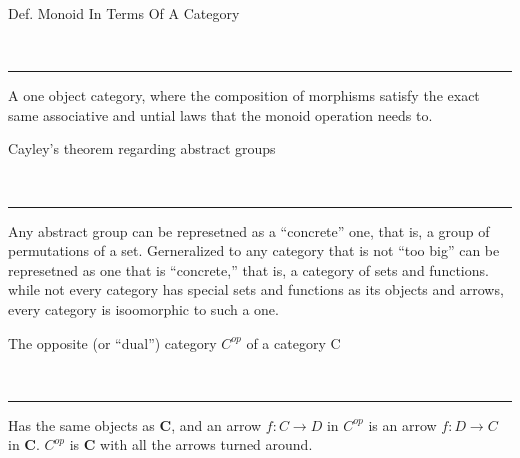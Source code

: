 \begin{note}
  \begin{field}
    Def. Monoid In Terms Of A Category
  \end{field} \\
  \noindent\rule[0.5ex]{\linewidth}{1pt}
  \begin{field}
    A one object category, where the composition of morphisms satisfy the exact same associative and untial laws that the monoid operation needs to.
  \end{field}
\end{note}

\begin{note}
  \begin{field}
   Cayley's theorem regarding abstract groups
  \end{field} \\
  \noindent\rule[0.5ex]{\linewidth}{1pt}
  \begin{field}
   Any abstract group can be represetned as a ``concrete'' one, that is, a group of permutations of a set. Gerneralized to any category that is not
   ``too big'' can be represetned as one that is ``concrete,'' that is, a category of sets and functions.\\
    while not every category has special sets and functions as its objects and arrows, every category is isoomorphic to such a one.
  \end{field}
\end{note}

\begin{note}
  \begin{field}
  The opposite (or ``dual'') category $C^{op}$ of a category C
  \end{field} \\
  \noindent\rule[0.5ex]{\linewidth}{1pt}
  \begin{field}
  Has the same objects as \textbf{C}, and an arrow $f: C \rightarrow D$ in \textbf{$C^{op}$} is an arrow $f: D \rightarrow C$ in \textbf{C}.
  \textbf{$C^{op}$} is \textbf{C} with all the arrows turned around.
  \end{field}
\end{note}

